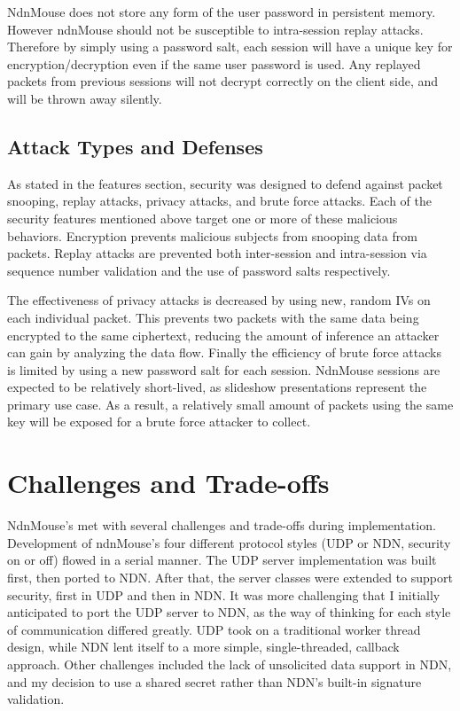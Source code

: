 \documentclass{sig-alternate}
\renewcommand\_{\textunderscore\allowbreak}  %
\begin{document}
NdnMouse does not store any form of the user password in persistent memory. However ndnMouse should not be susceptible to intra-session replay attacks. Therefore by simply using a password salt, each session will have a unique key for encryption/decryption even if the same user password is used. Any replayed packets from previous sessions will not decrypt correctly on the client side, and will be thrown away silently.

\subsection{Attack Types and Defenses}
As stated in the features section, security was designed to defend against packet snooping, replay attacks, privacy attacks, and brute force attacks. Each of the security features mentioned above target one or more of these malicious behaviors. Encryption prevents malicious subjects from snooping data from packets. Replay attacks are prevented both inter-session and intra-session via sequence number validation and the use of password salts respectively. 

The effectiveness of privacy attacks is decreased by using new, random IVs on each individual packet. This prevents two packets with the same data being encrypted to the same ciphertext, reducing the amount of inference an attacker can gain by analyzing the data flow. Finally the efficiency of brute force attacks is limited by using a new password salt for each session. NdnMouse sessions are expected to be relatively short-lived, as slideshow presentations represent the primary use case. As a result, a relatively small amount of packets using the same key will be exposed for a brute force attacker to collect.
	
\section{Challenges and Trade-offs}
NdnMouse's met with several challenges and trade-offs during implementation. Development of ndnMouse's four different protocol styles (UDP or NDN, security on or off) flowed in a serial manner. The UDP server implementation was built first, then ported to NDN. After that, the server classes were extended to support security, first in UDP and then in NDN. It was more challenging that I initially anticipated to port the UDP server to NDN, as the way of thinking for each style of communication differed greatly. UDP took on a traditional worker thread design, while NDN lent itself to a more simple, single-threaded, callback approach. Other challenges included the lack of unsolicited data support in NDN, and my decision to use a shared secret rather than NDN's built-in signature validation.
\end{document}
